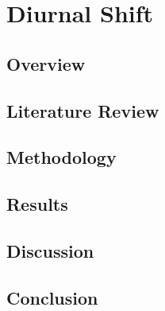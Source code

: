 \chapter{Diurnal Shift}
\section{Overview}
\section{Literature Review}
\section{Methodology}
\section{Results}
\section{Discussion}
\section{Conclusion}
